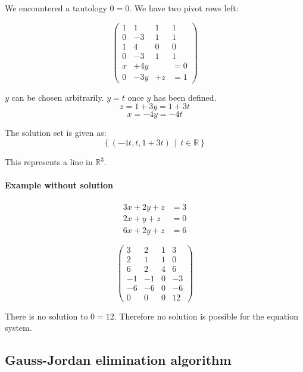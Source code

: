 \documentclass[a4paper,landscape,twocolumn]{article}
\newcommand\setdef[2]{\left\{#1\,\middle|\,#2\right\}}
\begin{document}
We encountered a tautology $0 = 0$. We have two pivot rows left:

\[
  \left(\begin{array}{ccc|c}
     1 &  1 &  1 & 1 \\
     0 & -3 &  1 & 1 \\
   \hline
     1 &  4 &  0 & 0 \\
     0 & -3 &  1 & 1 \\
   \hline
     x & +4y &    &= 0 \\
     0 & -3y & +z &= 1
  \end{array}\right)
\]

$y$ can be chosen arbitrarily. $y = t$ once $y$ has been defined.
\[ z = 1 + 3y = 1 + 3t \]
\[ x = -4y = -4t \]

The solution set is given as:
\[ \setdef{(-4t, t, 1 + 3t)}{t \in \mathbb{R}} \]

This represents a line in $\mathbb{R}^3$.

\paragraph{Example without solution}
\begin{align*}
  3x + 2y + z & =3 \\
  2x +  y + z &= 0 \\
  6x + 2y + z &= 6
\end{align*}

\[
  \left(\begin{array}{ccc|c}
      3 &  2 &  1 & 3 \\
      2 &  1 &  1 & 0 \\
      6 &  2 &  4 & 6 \\
   \hline
     -1 & -1 &  0 & -3 \\
     -6 & -6 &  0 & -6 \\
   \hline
     0 &   0 &  0 & 12
  \end{array}\right)
\]

There is no solution to $0 = 12$. Therefore no solution is possible for the equation system.

\subsection{Gauss-Jordan elimination algorithm}
\end{document}

